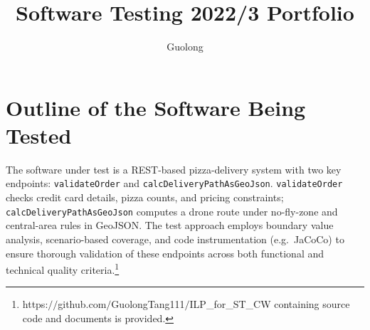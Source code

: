 \documentclass{article}
\title{Software Testing 2022/3 Portfolio}
\author{Guolong}
\begin{document}
\maketitle

\section{Outline of the Software Being Tested}

The software under test is a REST-based pizza-delivery system with two key endpoints:
\texttt{validateOrder} and \texttt{calcDeliveryPathAsGeoJson}.
\texttt{validateOrder} checks credit card details, pizza counts, and pricing constraints;
\texttt{calcDeliveryPathAsGeoJson} computes a drone route under no-fly-zone and central-area rules in GeoJSON.
The test approach employs boundary value analysis, scenario-based coverage,
and code instrumentation (e.g.\ JaCoCo) to ensure thorough validation of these endpoints
across both functional and technical quality criteria.\footnote{https:$//$github.com$/$GuolongTang111$/$ILP\_for\_ST\_CW containing source code and documents is provided.}
\end{document}
